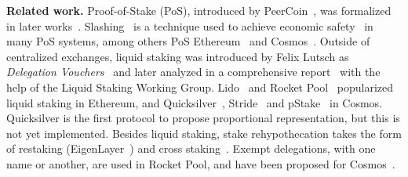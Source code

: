 \noindent
\textbf{Related work.}
Proof-of-Stake (PoS), introduced by PeerCoin~\cite{peercoin}, was formalized
in later works~\cite{ouroboros,praos,ouroboros-genesis,algorand,DBLP:journals/iacr/BentovPS16a}.
Slashing~\cite{slashing} is a technique used to achieve economic safety~\cite{slashable-safety}
in many PoS systems, among others
PoS Ethereum~\cite{casper,buterin2020combining}
and Cosmos~\cite{2018tendermint,buchman2016tendermint,cosmossdk}.
Outside of centralized exchanges, liquid staking was introduced by Felix Lutsch
as \emph{Delegation Vouchers}~\cite{delegation-vouchers}
and later analyzed in a comprehensive report~\cite{liquid-staking-report} with
the help of the Liquid Staking Working Group.
Lido~\cite{lido} and Rocket Pool~\cite{rocket-pool} popularized liquid staking
in Ethereum, and Quicksilver~\cite{quicksilver}, Stride~\cite{stride} and
pStake~\cite{pstake} in Cosmos. Quicksilver is the first protocol to propose proportional
representation, but this is not yet implemented.
Besides liquid staking, stake rehypothecation takes the form of
restaking (EigenLayer~\cite{eigenlayer}) and cross staking~\cite{mesh-security}.
Exempt delegations, with one name or another, are used in Rocket Pool,
and have been proposed for Cosmos~\cite{adr-liquid-staking}.
